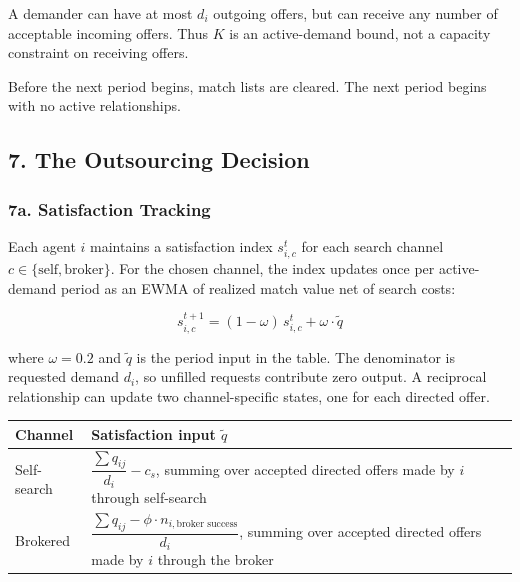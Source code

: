 \documentclass[11pt]{article}
\begin{document}
A demander can have at most \(d_i\) outgoing offers, but can receive any number of acceptable incoming offers. Thus \(K\) is an active-demand bound, not a capacity constraint on receiving offers.

Before the next period begins, match lists are cleared. The next period begins with no active relationships.

\subsection{7. The Outsourcing Decision}\label{the-outsourcing-decision}

\subsubsection{7a. Satisfaction Tracking}\label{a.-satisfaction-tracking}

Each agent \(i\) maintains a satisfaction index \(s_{i,c}^t\) for each search channel \(c \in \{\text{self}, \text{broker}\}\). For the chosen channel, the index updates once per active-demand period as an EWMA of realized match value net of search costs:

\[s_{i,c}^{t+1} = (1 - \omega)\,s_{i,c}^t + \omega \cdot \tilde{q}\]

where \(\omega = 0.2\) and \(\tilde{q}\) is the period input in the table. The denominator is requested demand \(d_i\), so unfilled requests contribute zero output. A reciprocal relationship can update two channel-specific states, one for each directed offer.

{
\begin{longtable}[]{@{}
  >{\raggedright\arraybackslash}p{}
  >{\raggedright\arraybackslash}p{}@{}}
\toprule\noalign{}
\begin{minipage}[b]{\linewidth}\raggedright
Channel
\end{minipage} & \begin{minipage}[b]{\linewidth}\raggedright
Satisfaction input \(\tilde{q}\)
\end{minipage} \\
\midrule\noalign{}
\endhead
\bottomrule\noalign{}
\endlastfoot
Self-search & \(\dfrac{\sum q_{ij}}{d_i} - c_s\), summing over accepted directed offers made by \(i\) through self-search \\
Brokered & \(\dfrac{\sum q_{ij} - \phi \cdot n_{i,\text{broker success}}}{d_i}\), summing over accepted directed offers made by \(i\) through the broker \\
\end{longtable}
}
\end{document}
